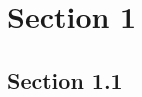 \documentclass{article}
\begin{document}
\section{Section 1}\label{sec1}
\subsection{Section 1.1}
\label{sec2}
\end{document}
